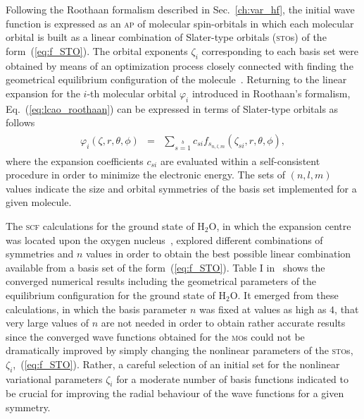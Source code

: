 Following the Roothaan formalism described in Sec.~\ref{ch:var_hf},
the initial wave function is expressed as an \textsc{ap} of molecular
spin-orbitals in which each molecular orbital is built as a linear
combination of Slater-type orbitals (\textsc{sto}s) of the
form~(\ref{eq:f_STO}). The orbital exponents $\zeta_{i}$ corresponding
to each basis set were obtained by means of an optimization process
closely connected with finding the geometrical equilibrium
configuration of the
molecule~\cite{Moccia_JCP_2164,Moccia_1964}. Returning to the linear
expansion for the $i$-th molecular orbital $\varphi_{i}$ introduced in
Roothaan's formalism, Eq.~(\ref{eq:lcao_roothaan}) can be expressed in
terms of Slater-type orbitals as follows
%
\begin{eqnarray}
  \begin{split}
    \varphi_{i}(\zeta,r,\theta,\phi) & = &
    \sum\limits_{s=1}\limits^{b} c_{si} f_{s_{n,l,m}}(\zeta_{si},r,\theta,\phi),
  \end{split}
  \label{eq:STO_expansion}
\end{eqnarray}
%
where the expansion coefficients $c_{si}$ are evaluated within a
self-consistent procedure in order to minimize the electronic
energy. The sets of $(n,l,m)$ values indicate the size and orbital
symmetries of the basis set implemented for a given molecule.

The \textsc{scf} calculations for the ground state of H$_{2}$O, in
which the expansion centre was located upon the oxygen
nucleus~\cite{Moccia_1964}, explored different combinations of
symmetries and $n$ values in order to obtain the best possible linear
combination available from a basis set of the
form~(\ref{eq:f_STO}). Table I in~\cite{Moccia_1964} shows the
converged numerical results including the geometrical parameters of
the equilibrium configuration for the ground state of H$_{2}$O. It
emerged from these calculations, in which the basis parameter $n$ was
fixed at values as high as $4$, that very large values of $n$ are not
needed in order to obtain rather accurate results since the converged
wave functions obtained for the \textsc{mo}s could not be dramatically
improved by simply changing the nonlinear parameters of the
\textsc{sto}s, $\zeta_{i}$,~(\ref{eq:f_STO}). Rather, a careful
selection of an initial set for the nonlinear variational parameters
$\zeta_{i}$ for a moderate number of basis functions indicated to be
crucial for improving the radial behaviour of the wave functions for a
given symmetry.

